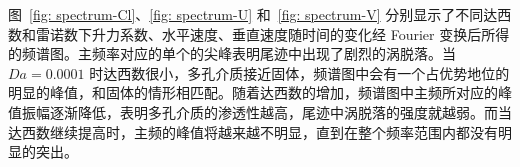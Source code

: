 图~\ref{fig: spectrum-Cl}、\ref{fig: spectrum-U} 和~\ref{fig: spectrum-V} 分别显示了不同达西数和雷诺数下升力系数、水平速度、垂直速度随时间的变化经 Fourier 变换后所得的频谱图。主频率对应的单个的尖峰表明尾迹中出现了剧烈的涡脱落。当 $Da=0.0001$ 时达西数很小，多孔介质接近固体，频谱图中会有一个占优势地位的明显的峰值，和固体的情形相匹配。随着达西数的增加，频谱图中主频所对应的峰值振幅逐渐降低，表明多孔介质的渗透性越高，尾迹中涡脱落的强度就越弱。而当达西数继续提高时，主频的峰值将越来越不明显，直到在整个频率范围内都没有明显的突出。%



